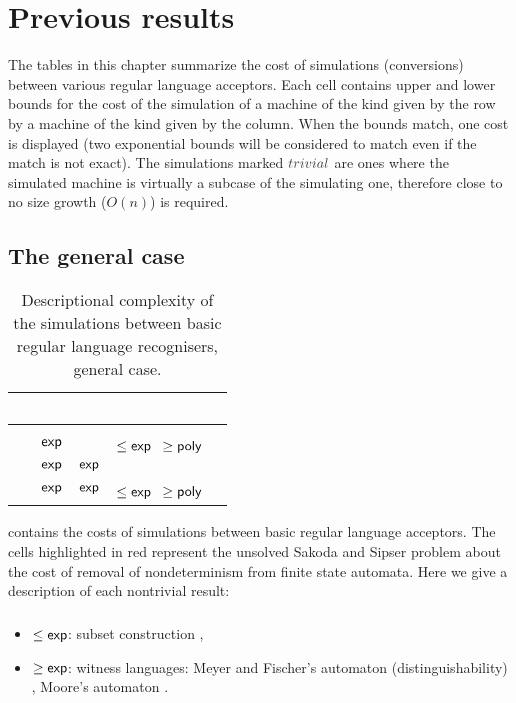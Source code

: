 \chapter{Previous results}
The tables in this chapter summarize the cost of simulations (conversions) between various regular language acceptors.
Each cell contains upper and lower bounds for the cost of the simulation of a machine of the kind given by the row by a machine of the kind given by the column.
When the bounds match, one cost is displayed (two exponential bounds will be considered to match even if the match is not exact).
The simulations marked $\Ctriv$ are ones where the simulated machine is virtually a subcase of the simulating one, therefore close to no size growth ($O(n)$) is required.


\section{The general case}

\begin{table}
	\centering
	\renewcommand{\hstdef}{.35}
	\begin{tabular}{|l|l|l|p{2.9em}|l|}
		\hline
		~     & \ODFA   & \ONFA   & \TDFA                          & \TNFA  \\ \hline
		\ODFA & \cY     & \Ctriv  & \Ctriv                         & \Ctriv \\ \hline
		\ONFA & $\mathsf{exp}$ & \cY     & \cR $\le\Cexp\hst$ $\ge\mathsf{poly}$ & \Ctriv \\ \hline
		\TDFA & $\mathsf{exp}$ & $\mathsf{exp}$ & \cY                            & \Ctriv \\ \hline
		\TNFA & $\mathsf{exp}$ & $\mathsf{exp}$ & \cR $\le\Cexp\hst$ $\ge\mathsf{poly}$ & \cY    \\ \hline
	\end{tabular}
	\caption{Descriptional complexity of the simulations between basic regular language recognisers, general case.}
	\label{tab:sims-core-general}
\end{table}

 contains the costs of simulations between basic regular language acceptors.
The cells highlighted in red represent the unsolved Sakoda and Sipser problem \cite{SakSip78} about the cost of removal of nondeterminism from finite state automata.
Here we give a description of each nontrivial result:

\paragraph{\ONFA{}\tto\ODFA}\label{cost:1NFAto1DFA}
\begin{itemize}
	\item $\le\mathsf{exp}$: subset construction \cite{RabSco59},
	\item $\ge\mathsf{exp}$: witness languages: Meyer and Fischer's automaton (distinguishability) \cite{MeyFis71}, Moore's automaton \cite{Moo71}.
\end{itemize}
